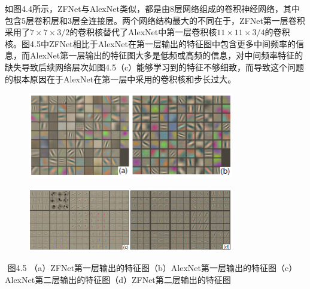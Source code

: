 ​
如图4.4所示，ZFNet与AlexNet类似，都是由8层网络组成的卷积神经网络，其中包含5层卷积层和3层全连接层。两个网络结构最大的不同在于，ZFNet第一层卷积采用了\(7\times7\times3/2\)的卷积核替代了AlexNet中第一层卷积核\(11\times11\times3/4\)的卷积核。图4.5中ZFNet相比于AlexNet在第一层输出的特征图中包含更多中间频率的信息，而AlexNet第一层输出的特征图大多是低频或高频的信息，对中间频率特征的缺失导致后续网络层次如图4.5（c）能够学习到的特征不够细致，而导致这个问题的根本原因在于AlexNet在第一层中采用的卷积核和步长过大。

\begin{figure}
\centering
\includegraphics[width=0.8\textwidth]{./img/ch4/zfnet-layer1.png}
\caption{}
\end{figure}

\begin{figure}
\centering
\includegraphics[width=0.8\textwidth]{./img/ch4/zfnet-layer2.png}
\caption{}
\end{figure}

​ 图4.5
（a）ZFNet第一层输出的特征图（b）AlexNet第一层输出的特征图（c）AlexNet第二层输出的特征图（d）ZFNet第二层输出的特征图

